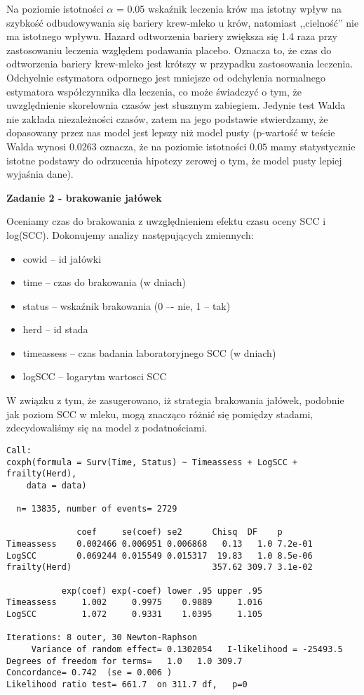 \documentclass[]{article}
\begin{document}
Na poziomie istotności \(\alpha\) = 0.05 wskaźnik leczenia krów ma
istotny wpływ na szybkość odbudowywania się bariery krew-mleko u krów,
natomiast ,,cielność'' nie ma istotnego wpływu. Hazard odtworzenia
bariery zwiększa się 1.4 raza przy zastosowaniu leczenia względem
podawania placebo. Oznacza to, że czas do odtworzenia bariery krew-mleko
jest krótszy w przypadku zastosowania leczenia. Odchyelnie estymatora
odpornego jest mniejsze od odchylenia normalnego estymatora
współczynnika dla leczenia, co może świadczyć o tym, że uwzględnienie
skorelownia czasów jest słusznym zabiegiem. Jedynie test Walda nie
zakłada niezależności czasów, zatem na jego podstawie stwierdzamy, że
dopasowany przez nas model jest lepszy niż model pusty (p-wartość w
teście Walda wynosi 0.0263 oznacza, że na poziomie istotności \(0.05\)
mamy statystycznie istotne podstawy do odrzucenia hipotezy zerowej o
tym, że model pusty lepiej wyjaśnia dane).

\textbf{Zadanie 2 - brakowanie jałówek}

Oceniamy czas do brakowania z uwzględnieniem efektu czasu oceny SCC i
log(SCC). Dokonujemy analizy następujących zmiennych:

\begin{itemize}
\item cowid -- id jałówki
\item time -- czas do brakowania (w dniach)
\item status -- wskaźnik brakowania (0 –- nie, 1 -- tak)
\item herd -- id stada
\item timeassess -- czas badania laboratoryjnego SCC (w dniach)
\item logSCC -- logarytm wartosci SCC
\end{itemize}

W związku z tym, że zasugerowano, iż strategia brakowania jałówek,
podobnie jak poziom SCC w mleku, mogą znacząco różnić się pomiędzy
stadami, zdecydowaliśmy się na model z podatnościami.

\begin{verbatim}
Call:
coxph(formula = Surv(Time, Status) ~ Timeassess + LogSCC + frailty(Herd), 
    data = data)

  n= 13835, number of events= 2729 

              coef     se(coef) se2      Chisq  DF    p      
Timeassess    0.002466 0.006951 0.006868   0.13   1.0 7.2e-01
LogSCC        0.069244 0.015549 0.015317  19.83   1.0 8.5e-06
frailty(Herd)                            357.62 309.7 3.1e-02

           exp(coef) exp(-coef) lower .95 upper .95
Timeassess     1.002     0.9975    0.9889     1.016
LogSCC         1.072     0.9331    1.0395     1.105

Iterations: 8 outer, 30 Newton-Raphson
     Variance of random effect= 0.1302054   I-likelihood = -25493.5 
Degrees of freedom for terms=   1.0   1.0 309.7 
Concordance= 0.742  (se = 0.006 )
Likelihood ratio test= 661.7  on 311.7 df,   p=0
\end{verbatim}
\end{document}
